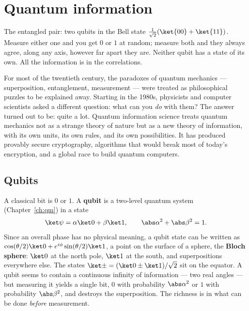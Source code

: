 \chapter{Quantum information}
\label{ch:qinfo}



\begin{prototype}
The entangled pair: two qubits in the Bell state $\tfrac{1}{\sqrt2}(\ket{00}+\ket{11})$. Measure either one and you get $0$ or $1$ at random; measure both and they always agree, along any axis, however far apart they are. Neither qubit has a state of its own. All the information is in the correlations.
\end{prototype}

For most of the twentieth century, the paradoxes of quantum mechanics --- superposition, entanglement, measurement --- were treated as philosophical puzzles to be explained away. Starting in the 1980s, physicists and computer scientists asked a different question: what can you \emph{do} with them? The answer turned out to be: quite a lot. Quantum information science treats quantum mechanics not as a strange theory of nature but as a new theory of information, with its own units, its own rules, and its own possibilities. It has produced provably secure cryptography, algorithms that would break most of today's encryption, and a global race to build quantum computers.

\section{Qubits}

A classical bit is $0$ or $1$. A \textbf{qubit} is a two-level quantum system (Chapter~\ref{ch:qm}) in a state
\[
  \ket\psi = \alpha\ket0 + \beta\ket1, \qquad\abs\alpha^2 + \abs\beta^2 = 1 .
\]
Since an overall phase has no physical meaning, a qubit state can be written as $\cos(\theta/2)\ket0 + e^{i\phi}\sin(\theta/2)\ket1$, a point on the surface of a sphere, the \textbf{Bloch sphere}: $\ket0$ at the north pole, $\ket1$ at the south, and superpositions everywhere else. The states $\ket\pm = (\ket0\pm\ket1)/\sqrt2$ sit on the equator. A qubit seems to contain a continuous infinity of information --- two real angles --- but measuring it yields a single bit, $0$ with probability $\abs\alpha^2$ or $1$ with probability $\abs\beta^2$, and destroys the superposition. The richness is in what can be done \emph{before} measurement.

